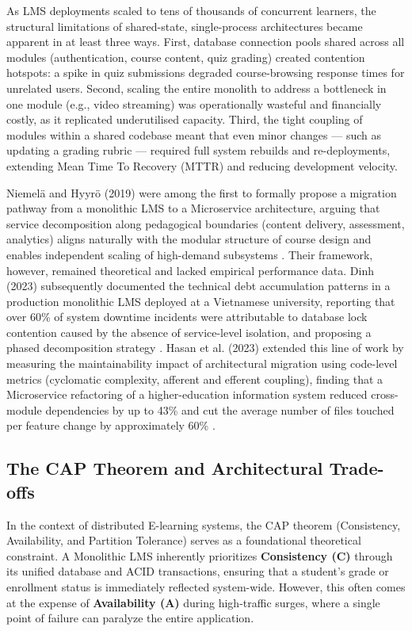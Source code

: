 As LMS deployments scaled to tens of thousands of concurrent learners, the structural limitations of 
shared-state, single-process architectures became apparent in at least three ways. First, database 
connection pools shared across all modules (authentication, course content, quiz grading) created 
contention hotspots: a spike in quiz submissions degraded course-browsing response times for unrelated 
users. Second, scaling the entire monolith to address a bottleneck in one module (e.g., video streaming) 
was operationally wasteful and financially costly, as it replicated underutilised capacity. Third, the 
tight coupling of modules within a shared codebase meant that even minor changes — such as updating a 
grading rubric — required full system rebuilds and re-deployments, extending Mean Time To Recovery (MTTR) 
and reducing development velocity.

Niemelä and Hyyrö (2019) were among the first to formally propose a migration pathway from a monolithic 
LMS to a Microservice architecture, arguing that service decomposition along pedagogical boundaries 
(content delivery, assessment, analytics) aligns naturally with the modular structure of course design 
and enables independent scaling of high-demand subsystems \cite{Pia_Niemela}. Their framework, 
however, remained theoretical and lacked empirical performance data. Dinh (2023) subsequently documented 
the technical debt accumulation patterns in a production monolithic LMS deployed at a Vietnamese 
university, reporting that over 60\% of system downtime incidents were attributable to database 
lock contention caused by the absence of service-level isolation, and proposing a phased 
decomposition strategy \cite{nguyen_van_dinh_2023}. Hasan et al. (2023) extended this line of work by measuring 
the maintainability impact of architectural migration using code-level metrics (cyclomatic complexity, 
afferent and efferent coupling), finding that a Microservice refactoring of a higher-education 
information system reduced cross-module dependencies by up to 43\% and cut the average number of 
files touched per feature change by approximately 60\% \cite{IJACSA2023}.

\subsection{The CAP Theorem and Architectural Trade-offs}
In the context of distributed E-learning systems, the CAP theorem (Consistency, Availability, and Partition Tolerance) serves as a foundational theoretical constraint. A Monolithic LMS inherently prioritizes \textbf{Consistency (C)} through its unified database and ACID transactions, ensuring that a student's grade or enrollment status is immediately reflected system-wide. However, this often comes at the expense of \textbf{Availability (A)} during high-traffic surges, where a single point of failure can paralyze the entire application.

